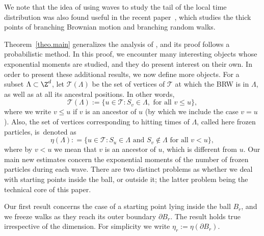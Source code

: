 We note that the idea of using waves to study the tail of the local time distribution was also found useful in the recent paper~\cite{BHJ23}, which studies the thick points of branching Brownian motion and branching random walks.

Theorem~\ref{theo.main} generalizes the analysis of \cite{AHJ},
and its proof follows a probabilistic method. In this proof, we
encounter many interesting objects whose exponential moments
are studied, and they do present interest on their own.
In order to present these additional results, we now define more objects.
For a subset $\Lambda\subset \Z^d$, let $\mathcal T(\Lambda)$
be the set of vertices of $\mathcal T$ at which the BRW is in $\Lambda$, as well as at all its ancestral positions. In other words,
\begin{equation}\label{def.Tr}
\mathbf {\mathcal T}(\Lambda) :=
\big\{u\in \mathbf{\mathcal T}: S_v\in \Lambda, \text{ for all }v\le u\},
\end{equation}
where we write $v\le u$ if $v$ is an ancestor of $u$ (by which we include the case $v=u$).
Also, the set of vertices corresponding to hitting times of $\Lambda$, called here frozen particles, is~denoted as
\begin{equation}\label{etar}
\eta(\Lambda) : = \big\{u\in \mathbf {\mathcal T}: S_u \in \Lambda
\text{ and }S_v \notin \Lambda \text{ for all }v< u\},
\end{equation}
where by $v<u$ we mean that $v$ is an ancestor of $u$, which is different from $u$.
Our main new estimates concern the exponential moments of the
number of frozen particles during each wave. There are two distinct
problems as whether we deal with starting points inside the ball, or outside it;
the latter problem being the technical core of this paper.

Our first result concerns the case of a starting point
lying inside the ball $B_r$, and
we freeze walks as they reach its outer boundary $\partial B_r$. The result holds true irrespective of the dimension.
For simplicity we write $\eta_r:=\eta(\partial B_r)$.

